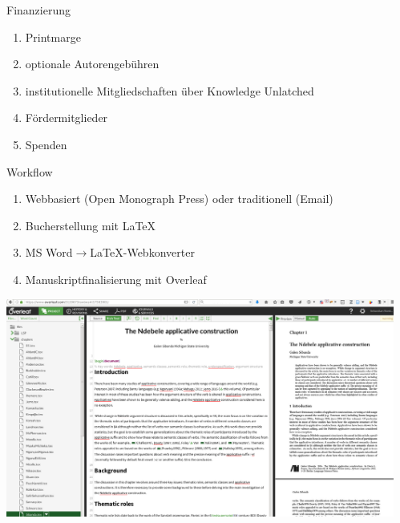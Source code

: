 \documentclass[final,utf8]{beamer}
\begin{document}
\begin{frame}{}
\begin{columns}[t]
\begin{column}{.45\linewidth}
    \begin{block}{Finanzierung} 
	\begin{enumerate} 
	    \item Printmarge
	    \item optionale Autorengeb\"uhren
	    \item institutionelle Mitgliedschaften \"uber Knowledge Unlatched
	    \item F\"ordermitglieder
	    \item Spenden
	\end{enumerate}  
    \end{block} 



    \begin{block}{Workflow} 
	\begin{enumerate} 
	    \item Webbasiert (Open Monograph Press) oder traditionell (Email)
	    \item Bucherstellung mit {\LaTeX}
	    \item MS Word$\to${\LaTeX}-Webkonverter
	    \item Manuskriptfinalisierung mit Overleaf
	\end{enumerate}  
     \includegraphics[width=.9\textwidth]{overleaf.png}
  
    \end{block} 

 

 

  \end{column}


  \begin{column}{.45\linewidth}
    

\end{column}
\end{columns}
\end{frame}
\end{document}
